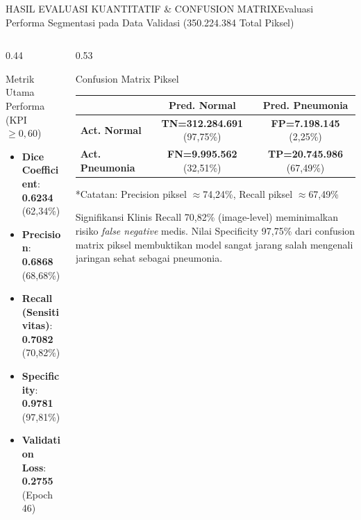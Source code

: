 \documentclass[aspectratio=169,11pt]{beamer}
\begin{document}
\begin{frame}[shrink=5]{HASIL EVALUASI KUANTITATIF \& CONFUSION MATRIX}{Evaluasi Performa Segmentasi pada Data Validasi (350.224.384 Total Piksel)}
\begin{columns}[T]
  \begin{column}{0.44\textwidth}
    \begin{block}{\footnotesize Metrik Utama Performa (KPI $\ge 0,60$)}
      \begin{itemize}\scriptsize
        \item \textbf{Dice Coefficient}: \textbf{0.6234} (62,34\%)
        \item \textbf{Precision}: \textbf{0.6868} (68,68\%)
        \item \textbf{Recall (Sensitivitas)}: \textbf{0.7082} (70,82\%)
        \item \textbf{Specificity}: \textbf{0.9781} (97,81\%)
        \item \textbf{Validation Loss}: \textbf{0.2755} (Epoch 46)
      \end{itemize}
    \end{block}
  \end{column}

  \begin{column}{0.53\textwidth}
    \begin{block}{\footnotesize Confusion Matrix Piksel}
      \centering
      \tiny
      \begin{tabular}{lcc}
        \toprule
        & \textbf{Pred. Normal} & \textbf{Pred. Pneumonia} \\
        \midrule
        \textbf{Act. Normal} & \textbf{TN=312.284.691} (97,75\%) & \textbf{FP=7.198.145} (2,25\%) \\
        \textbf{Act. Pneumonia} & \textbf{FN=9.995.562} (32,51\%) & \textbf{TP=20.745.986} (67,49\%) \\
        \bottomrule
      \end{tabular}
      
      \vspace{0.1cm}
      *Catatan: Precision piksel $\approx$74,24\%, Recall piksel $\approx$67,49\%
    \end{block}
    \begin{exampleblock}{\footnotesize Signifikansi Klinis}
      \scriptsize Recall 70,82\% (image-level) meminimalkan risiko \textit{false negative} medis. Nilai Specificity 97,75\% dari confusion matrix piksel membuktikan model sangat jarang salah mengenali jaringan sehat sebagai pneumonia.
    \end{exampleblock}
  \end{column}
\end{columns}
\end{frame}
\end{document}
